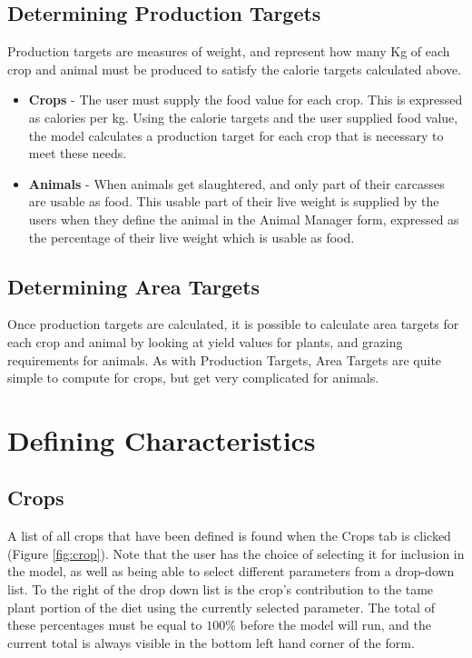  \subsection{Determining Production Targets}
    Production targets are measures of weight, and represent how many Kg of each
    crop and animal must be produced to satisfy the calorie targets calculated
    above.
  \begin{itemize}
    \item \textbf{Crops} - The user must supply the food value for each crop. 
      This is expressed as calories per kg.  Using the calorie targets and the
      user supplied food value, the model calculates a production target for each
      crop that is necessary to meet these needs.
    \item \textbf{Animals} - When animals get slaughtered, and only part of
      their carcasses are usable as food.  This usable part of their live weight
      is supplied by the users when they define the animal in the Animal Manager
      form, expressed as the percentage of their live weight which is usable as food.
  \end{itemize}

  \subsection{Determining Area Targets}
  Once production targets are calculated, it is possible to calculate area
  targets for each crop and animal by looking at yield values for plants, and
  grazing requirements for animals.  As with Production Targets, Area Targets
  are quite simple to compute for crops, but get very complicated for animals.

\section{Defining Characteristics}
 \subsection{Crops}
    A list of all crops that have been defined is found when the Crops tab is
    clicked (Figure \ref{fig:crop}).  Note that the user has the choice of
    selecting it for inclusion in the model, as well as being able to select
    different parameters from a drop-down list.  To the right of the drop down
    list is the crop's contribution to the tame plant portion of the diet using
    the currently selected parameter.  The total of these percentages must be
    equal to $100\%$ before the model will run, and the current total is always
    visible in the bottom left hand corner of the form.

